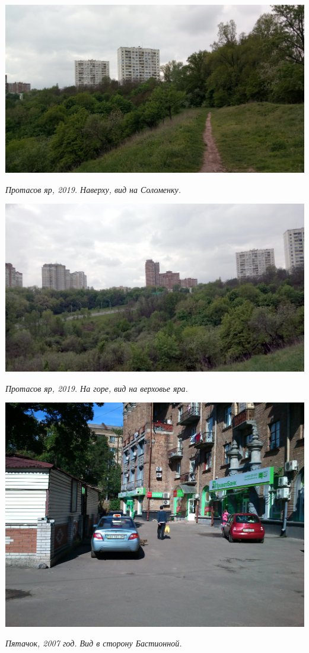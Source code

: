\begin{center}
\includegraphics[width=\linewidth]{rpix/IMG_20190504_141816.jpg}

\textit{Протасов яр, 2019. Наверху, вид на Соломенку.}
\end{center}


\begin{center}
\includegraphics[width=\linewidth]{rpix/IMG_20190504_141817.jpg}

\textit{Протасов яр, 2019. На горе, вид на верховье яра.}
\end{center}


\begin{center}
\includegraphics[width=0.90\linewidth]{rpix/DSC_0022.JPG}

\textit{Пятачок, 2007 год. Вид в сторону Бастионной.}
\end{center}


